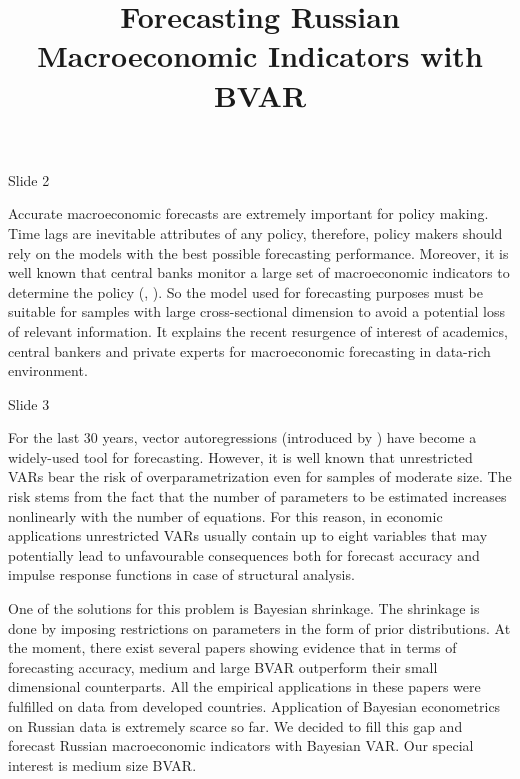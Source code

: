 \documentclass[12pt,a4paper,english,fleqn,oneside,openany]{article}
\begin{document}
\title{Forecasting Russian Macroeconomic Indicators with BVAR}


\maketitle

Slide 2

Accurate macroeconomic forecasts are extremely important for policy making. Time lags are inevitable attributes of any policy, therefore, policy makers should rely on the models with the best possible forecasting performance. Moreover, it is well known that central banks monitor a large set of macroeconomic indicators to determine the policy (\cite{beckner_1996}, \cite{bernanke_boivin_2003}). So the model used for forecasting purposes must be suitable for samples with large cross-sectional dimension to avoid a potential loss of relevant information.  It explains the recent resurgence of interest of academics, central bankers and private experts for macroeconomic forecasting in data-rich environment.

Slide 3

For the last 30 years, vector autoregressions (introduced by \cite{sims_1980}) have become a  widely-used tool for forecasting. However, it is well known that unrestricted VARs bear the risk of overparametrization even for samples of moderate size. The risk stems from the fact that the number of parameters to be estimated increases nonlinearly with the number of equations. For this reason, in economic applications unrestricted VARs usually contain up to eight variables that may potentially lead  to unfavourable consequences both for forecast accuracy and impulse response functions in case of structural analysis.

One of the solutions for this problem is Bayesian shrinkage. The shrinkage is done by imposing restrictions on parameters in the form of prior distributions. At the moment, there exist several papers showing evidence that in terms of forecasting accuracy, medium and large BVAR outperform their small dimensional counterparts. All the empirical applications in these papers were fulfilled on data from developed countries. Application of Bayesian econometrics on Russian data is extremely scarce so far. We decided to fill this gap and forecast Russian macroeconomic indicators with Bayesian VAR. Our special interest is medium size BVAR. 
\end{document}
